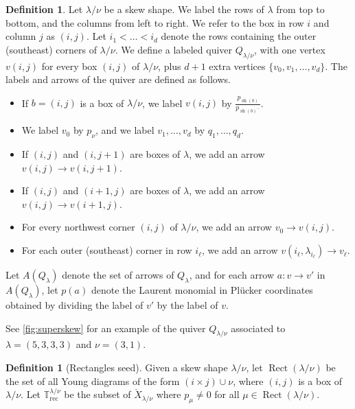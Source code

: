 \documentclass{amsart}
\theoremstyle{definition}
\newtheorem{definition}[thm]{Definition}
\numberwithin{equation}{section}
\newcommand{\rect}{\mathrm{rec}}
\def\Rect{\operatorname{Rect}}
\def\sh{\operatorname{sh}}
\begin{document}
\begin{definition}\label{def:superquiver2}
Let $\lambda/\nu$ be a skew shape.
We label the rows of $\lambda$ from top to bottom, and the columns from left to right.
We refer to the box in row $i$ and column $j$ as $(i,j)$.
Let $i_1<\dots< i_d$ denote the rows containing the outer (southeast) 
corners of $\lambda/\nu$.
We define a labeled quiver $Q_{\lambda/\nu}$, with one vertex 
$v(i,j)$ for every box $(i,j)$ of $\lambda/\nu$,
plus $d+1$ extra vertices
$\{v_0,v_1,\dots,v_d\}$.
The labels and arrows of the quiver are defined as follows.
\begin{itemize}
	\item If $b=(i,j)$ is a box of $\lambda/\nu$, 
                we label  $v(i,j)$  by
		 $\frac{p_{\sh(b)}}{p_{\sh(b)^-}}$.
        \item We label $v_0$ by $p_{\nu}$,
		and we label $v_1,\dots,v_d$ by $q_1,\dots,q_d$.
         \item If $(i,j)$ and $(i,j+1)$ are boxes of $\lambda$,
                 we add an arrow $v(i,j)\to v(i,j+1)$.
         \item If $(i,j)$ and $(i+1,j)$ are boxes of $\lambda$,
                 we add an arrow $v(i,j)\to v(i+1,j)$.
	 \item For every northwest corner $(i,j)$ of $\lambda/\nu$, 
		 we add an arrow 
                  $v_0 \to v(i,j)$.
	  \item For each outer (southeast) 
		  corner in row $i_\ell$, we add 
                  an arrow $v(i_{\ell}, \lambda_{i_{\ell}}) \to v_{\ell}$.
\end{itemize}
        Let $A(Q_{\lambda})$ denote the set of arrows of $Q_{\lambda}$, and for each
        arrow $a:v\to v'$ in $A(Q_{\lambda})$, let $p(a)$ denote the Laurent monomial
        in Pl\"ucker coordinates obtained
        by dividing the label of $v'$ by the label of $v$.

\end{definition}
See  \cref{fig:superskew} for an example of the quiver $Q_{\lambda/\nu}$ associated
to $\lambda = (5,3,3,3)$ and $\nu = (3,1)$.  

\begin{definition}[Rectangles seed]
Given a skew shape $\lambda/\nu$, let $\Rect(\lambda/\nu)$ be the set of all Young 
diagrams of the form $(i \times j) \cup \nu$,
where $(i,j)$ is a box of $\lambda/\nu$.
Let $\mathbb T^{\lambda/\nu}_{\rect}$ 
be the subset of $\check{X}_{\lambda/\nu}$ where
	$p_{\mu} \neq 0$ for all $\mu \in \Rect(\lambda/\nu)$.
\end{definition}
\end{document}
